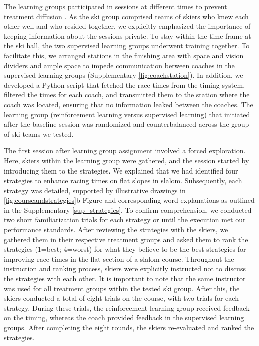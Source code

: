 \documentclass[pdflatex,sn-nature]{sn-jnl}%
\theoremstyle{thmstyleone}%
\theoremstyle{thmstyletwo}%
\theoremstyle{thmstylethree}%
\begin{document}
The learning groups participated in sessions at different times to prevent treatment diffusion \cite{maxwell_designing_2017}. As the ski group comprised teams of skiers who knew each other well and who resided together, we explicitly emphasized the importance of keeping information about the sessions private. To stay within the time frame at the ski hall, the two supervised learning groups underwent training together. To facilitate this, we arranged stations in the finishing area with space and vision dividers and ample space to impede communication between coaches in the supervised learning groups (Supplementary \ref{fig:coachstation}). In addition, we developed a Python script that fetched the race times from the timing system, filtered the times for each coach, and transmitted them to the station where the coach was located, ensuring that no information leaked between the coaches. The learning group (reinforcement learning versus supervised learning) that initiated after the baseline session was randomized and counterbalanced across the group of ski teams we tested. 

The first session after learning group assignment involved a forced exploration. Here, skiers within the learning group were gathered, and the session started by introducing them to the strategies. We explained that we had identified four strategies to enhance racing times on flat slopes in slalom. Subsequently, each strategy was detailed, supported by illustrative drawings in \ref{fig:courseandstrategies}b Figure and corresponding word explanations as outlined in the Supplementary \ref{sup_strategies}. To confirm comprehension, we conducted two short familiarization trials for each strategy or until the execution met our performance standards. After reviewing the strategies with the skiers, we gathered them in their respective treatment groups and asked them to rank the strategies (1=best; 4=worst) for what they believe to be the best strategies for improving race times in the flat section of a slalom course. Throughout the instruction and ranking process, skiers were explicitly instructed not to discuss the strategies with each other. It is important to note that the same instructor was used for all treatment groups within the tested ski group. After this, the skiers conducted a total of eight trials on the course, with two trials for each strategy. During these trials, the reinforcement learning group received feedback on the timing, whereas the coach provided feedback in the supervised learning groups. After completing the eight rounds, the skiers re-evaluated and ranked the strategies.
\end{document}
